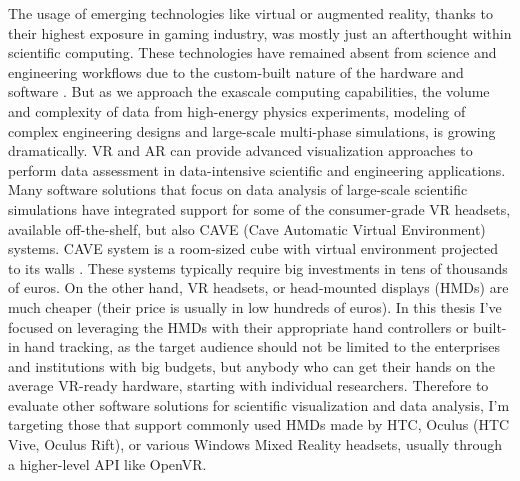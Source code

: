 The usage of emerging technologies like virtual or augmented reality, thanks to their highest exposure in gaming industry, was mostly just an afterthought within scientific computing. These technologies have remained absent from science and engineering workflows due to the custom-built nature of the hardware and software \citep{suVirtualAugmentedReality2020}. But as we approach the exascale computing capabilities, the volume and complexity of data from high-energy physics experiments, modeling of complex engineering designs and large-scale multi-phase simulations, is growing dramatically. VR and AR can provide advanced visualization approaches to perform data assessment in data-intensive scientific and engineering
applications. Many software solutions that focus on data analysis of large-scale scientific simulations have integrated support for some of the consumer-grade VR headsets, available off-the-shelf, but also CAVE (Cave Automatic Virtual Environment) systems. CAVE system is a room-sized cube with virtual environment projected to its walls \citep{ohnoIntroductionVirtualReality}. These systems typically require big investments in tens of thousands of euros. On the other hand, VR headsets, or head-mounted displays (HMDs) are much cheaper (their price is usually in low hundreds of euros). In this thesis I've focused on leveraging the HMDs with their appropriate hand controllers or built-in hand tracking, as the target audience should not be limited to the enterprises and institutions with big budgets, but anybody who can get their hands on the average VR-ready hardware, starting with individual researchers. Therefore to evaluate other software solutions for scientific visualization and data analysis, I'm targeting those that support commonly used HMDs made by HTC, Oculus (HTC Vive, Oculus Rift), or various Windows Mixed Reality headsets, usually through a higher-level API like OpenVR. 

